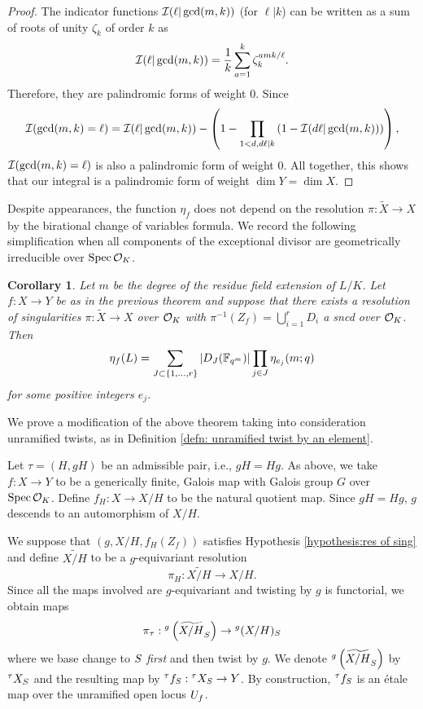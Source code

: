 \documentclass[10pt]{article}
\theoremstyle{plain}
\newtheorem{corollary}[theorem]{Corollary}
\theoremstyle{definition}
\numberwithin{equation}{section}
\begin{document}
\begin{proof}
The indicator functions ${\mathcal I}(\ell|\gcd(m,k))$ (for $\ell|k$) can be written as a sum of roots of unity $\zeta_k$ of order $k$ as 
\[{\mathcal I}(\ell|\gcd(m,k)) = \frac{1}{k}\sum_{a=1}^{k}\zeta_{k}^{amk/\ell}.\]
Therefore, they are palindromic forms of weight $0$. Since
\begin{equation}\label{eqn: open stratification formula}
    {\mathcal I}(\gcd(m,k) = \ell) = {\mathcal I}(\ell|\gcd(m,k)) - \left(1-\prod_{1 < d, d\ell|k}\left(1-{\mathcal I}(d\ell|\gcd(m,k))\right)\right),
\end{equation}
${\mathcal I}(\gcd(m,k) = \ell)$ is also a palindromic form of weight $0$. All together, this shows that our integral is a palindromic form of weight $\dim Y = \dim X$.
\end{proof}

Despite appearances, the function $\eta_f$ does not depend on the resolution $\pi: \widetilde X \to X$ by the birational change of variables formula. We record the following simplification when all components of the exceptional divisor are geometrically irreducible over $\operatorname{Spec} {{\mathcal O}_{K}}$.

\begin{corollary}\label{cor: pullback formula in sncd case}
Let $m$ be the degree of the residue field extension of $L/K$. Let $f: X \to Y$ be as in the previous theorem and suppose that there exists a resolution of singularities $\pi: \widetilde{X} \to X$ over ${{\mathcal O}_{K}}$ with $\pi^{-1}(Z_f) = \bigcup_{i=1}^r D_i$ a sncd over ${{\mathcal O}_{K}}$. Then
\[\eta_f({L}) = \sum_{J \subset \{1,\dots,r\}}\left|D_{J}(\mathbb F_{q^m})\right|\prod_{j\in J}\eta_{e_j}(m;q)\]
for some positive integers $e_j$.
\end{corollary}

We prove a modification of the above theorem taking into consideration unramified twists, as in Definition \ref{defn: unramified twist by an element}.

Let $\tau = (H,gH)$ be an admissible pair, i.e., $gH=Hg$. As above, we take $f: X \to Y$ to be a generically finite, Galois map with Galois group $G$ over $\operatorname{Spec} {{\mathcal O}_{K}}$. Define $f_{H}: X \to X/H$ to be the natural quotient map. Since $gH = Hg$, $g$ descends to an automorphism of $X/H$.

We suppose that $(g,X/H,f_H(Z_f))$ satisfies Hypothesis \ref{hypothesis:res of sing} and define $\widetilde{X/H}$ to be a $g$-equivariant resolution
\[\pi_H: \widetilde{X/H} \to X/H.\]
Since all the maps involved are $g$-equivariant and twisting by $g$ is functorial, we obtain maps
\[\pi_\tau: {^g\left(\widetilde{X/H}_{S}\right)} \to {^g{(X/H)_{S}}}\]
where we base change to $S$ \emph{first} and then twist by $g$. We denote ${^g\left(\widetilde{X/H}_{S}\right)}$ by ${^\tau X_{S}}$ and the resulting map by ${^\tau f_{S}}: {^\tau X_{S}} \to Y$. By construction, ${^\tau f_{S}}$ is an \'etale map over the unramified open locus $U_f$.
\end{document}
